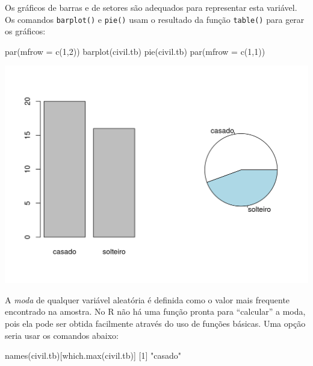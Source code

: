 \documentclass[
  10pt,
  a4paper]{book}
\newenvironment{Shaded}{\begin{snugshade}}{\end{snugshade}}
\newcommand{\AttributeTok}[1]{\textcolor[rgb]{0.77,0.63,0.00}{#1}}
\newcommand{\DecValTok}[1]{\textcolor[rgb]{0.00,0.00,0.81}{#1}}
\newcommand{\FunctionTok}[1]{\textcolor[rgb]{0.00,0.00,0.00}{#1}}
\newcommand{\NormalTok}[1]{#1}
\newcommand{\StringTok}[1]{\textcolor[rgb]{0.31,0.60,0.02}{#1}}
\begin{document}
Os gráficos de barras e de setores são adequados para representar esta
variável. Os comandos \texttt{barplot()} e \texttt{pie()} usam o resultado da função
\texttt{table()} para gerar os gráficos:

\begin{Shaded}
\begin{Highlighting}[]
\FunctionTok{par}\NormalTok{(}\AttributeTok{mfrow =} \FunctionTok{c}\NormalTok{(}\DecValTok{1}\NormalTok{,}\DecValTok{2}\NormalTok{))}
\FunctionTok{barplot}\NormalTok{(civil.tb)}
\FunctionTok{pie}\NormalTok{(civil.tb)}
\FunctionTok{par}\NormalTok{(}\AttributeTok{mfrow =} \FunctionTok{c}\NormalTok{(}\DecValTok{1}\NormalTok{,}\DecValTok{1}\NormalTok{))}
\end{Highlighting}
\end{Shaded}

\begin{center}\includegraphics{figures/unnamed-chunk-293-1} \end{center}

A \emph{moda} de qualquer variável aleatória é definida como o valor mais
frequente encontrado na amostra. No R não há uma função pronta para
``calcular'' a moda, pois ela pode ser obtida facilmente através do uso de
funções básicas. Uma opção seria usar os comandos abaixo:

\begin{Shaded}
\begin{Highlighting}[]
\FunctionTok{names}\NormalTok{(civil.tb)[}\FunctionTok{which.max}\NormalTok{(civil.tb)]}
\NormalTok{[}\DecValTok{1}\NormalTok{] }\StringTok{"casado"}
\end{Highlighting}
\end{Shaded}
\end{document}

